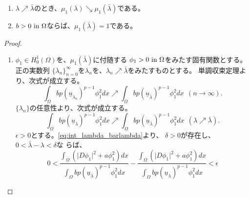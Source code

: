 \begin{lem} \label{lem:mu_1_bar_lambda}
 \begin{enumerate}[1.] \sage
  \item $\lambda \nearrow \bar{\lambda}$のとき、$\mu_1(\lambda)
        \searrow \mu_1(\bar{\lambda})$である。
  \item $b > 0 ~\text{in}~ \Omega$ならば、$\mu_1(\bar{\lambda}) = 1$である。
 \end{enumerate}
\end{lem}
\begin{proof}
 \begin{enumerate}[1.] \sage
  \item $\phi_1 \in H_0^1(\Omega)$を、$\mu_1(\bar{\lambda})$に付随する
        $\phi_1 > 0 ~\text{in}~ \Omega$をみたす固有関数とする。
        正の実数列
        $\{\lambda_n \}_{n=0}^\infty$を$\lambda_n$を、$\lambda_n
        \nearrow \bar{\lambda}$をみたすものとする。
        単調収束定理より、次式が成立する。
        \[
         \int_\Omega bp ( \underline{u}_{\lambda_n} )^{p-1} \phi_1^2
          dx \nearrow \int_\Omega bp
          (\underline{u}_{\bar{\lambda}})^{p-1} \phi_1^2 dx  \ \ (n
        \to \infty).        
        \]
        $\{\lambda_n \}$の任意性より、次式が成立する。
        \begin{equation}
         \int_\Omega bp ( \underline{u}_{\lambda} )^{p-1} \phi_1^2
          dx \nearrow \int_\Omega bp
          (\underline{u}_{\bar{\lambda}})^{p-1} \phi_1^2 dx
           \ \ (\lambda \nearrow \bar{\lambda}).
          \label{eq:int_lambda_barlambda}
        \end{equation}
        $\epsilon > 0$とする。\eqref{eq:int_lambda_barlambda}より、
        $\delta > 0$が存在し、$0 < \bar{\lambda} - \lambda < \delta$な
        らば、
        \begin{equation}
         0 < \frac{\displaystyle \int_\Omega \left( \lvert D\phi_1
                                              \rvert^2
                                              + a
                                             \phi_1^2\right) dx}
         {\displaystyle 
         \int_\Omega bp (\underline{u}_{\bar{\lambda}})^{p-1} \phi_1^2 dx}
         -
         \frac{\displaystyle \int_\Omega \left( \lvert D\phi_1
                                              \rvert^2
                                              + a
                                             \phi_1^2\right) dx}
         {\displaystyle 
         \int_\Omega bp (\underline{u}_{\lambda})^{p-1} \phi_1^2
         dx} < \epsilon \label{eq:zero_int_epsilon}
        \end{equation}

\end{enumerate}
\end{proof}
